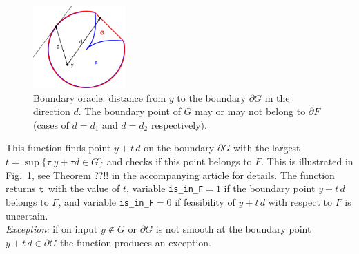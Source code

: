 \documentclass[a4paper]{article}
\newcommand{\R}{\mathbb{R}}
\theoremstyle{definition}
\begin{document}
\begin{enumerate}
\begin{figure}[H]
	\centering\includegraphics[width=100pt]{fig/boundary_oracle}
	\caption{Boundary oracle: distance from $y$ to the boundary $\partial G$ in the direction $d$. The boundary point of $G$ may or may not belong to $\partial F$ (cases of $d=d_1$ and $d=d_2$ respectively).}
\label{fig:two}
\end{figure}


This function finds point $y+t\,d$ on the boundary $\partial G$ with the largest $ {t} = \sup\{\tau\big| y+\tau d\in G\}$ and checks if this point belongs to $F$. 
This is illustrated in Fig.~\ref{fig:two}, see Theorem ??!! in the accompanying article for details. The function returns $\tt t$ with the value of $t$, variable
	{\tt  is\_in\_F}$=1$ if the boundary point $y+t\,d$ belongs to $F$, and variable {\tt  is\_in\_F}$=0$ if feasibility of $y+t\,d$ with respect to $F$ is uncertain.\\
{\it Exception:}  if on input $y\notin G$ or $\partial G$ is not smooth at the boundary point $y+t\,d\in \partial G$ the function produces an exception. 



%
%
%
%


\end{enumerate}
\end{document}
